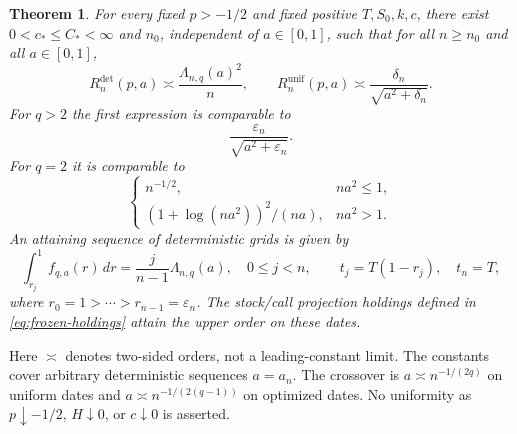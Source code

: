 \documentclass[11pt,a4paper]{amsart}
\theoremstyle{plain}
\newtheorem{theorem}{Theorem}[section]
\theoremstyle{definition}
\theoremstyle{remark}
\newcommand{\unif}{\mathrm{unif}}
\newcommand{\detm}{\mathrm{det}}
\newcommand{\eps}{\varepsilon}
\begin{document}
\begin{theorem}\label{thm:main}
For every fixed $p>-1/2$ and fixed positive $T,S_0,k,c$, there exist $0<c_*\le C_*<\infty$ and $n_0$, independent of $a\in[0,1]$, such that for all $n\ge n_0$ and all $a\in[0,1]$,
\begin{equation}\label{eq:main-rates}
 R_n^{\detm}(p,a)\asymp\frac{\Lambda_{n,q}(a)^2}{n},
 \qquad
 R_n^{\unif}(p,a)\asymp\frac{\delta_n}{\sqrt{a^2+\delta_n}}.
\end{equation}
For $q>2$ the first expression is comparable to
\begin{equation}\label{eq:supercritical}
 \frac{\eps_n}{\sqrt{a^2+\eps_n}}.
\end{equation}
For $q=2$ it is comparable to
\begin{equation}\label{eq:critical}
 \begin{cases}
 n^{-1/2},&na^2\le1,\\[2pt]
 (1+\log(na^2))^2/(na),&na^2>1.
 \end{cases}
\end{equation}
An attaining sequence of deterministic grids is given by
\begin{equation}\label{eq:quantiles}
 \int_{r_j}^1 f_{q,a}(r)\,dr=\frac{j}{n-1}\Lambda_{n,q}(a),
 \quad 0\le j<n,\qquad
 t_j=T(1-r_j),\quad t_n=T,
\end{equation}
where $r_0=1>\cdots>r_{n-1}=\eps_n$. The stock/call projection holdings defined in \eqref{eq:frozen-holdings} attain the upper order on these dates.
\end{theorem}

Here $\asymp$ denotes two-sided orders, not a leading-constant limit. The constants cover arbitrary deterministic sequences $a=a_n$. The crossover is $a\asymp n^{-1/(2q)}$ on uniform dates and $a\asymp n^{-1/(2(q-1))}$ on optimized dates. No uniformity as $p\downarrow-1/2$, $H\downarrow0$, or $c\downarrow0$ is asserted.
\end{document}
